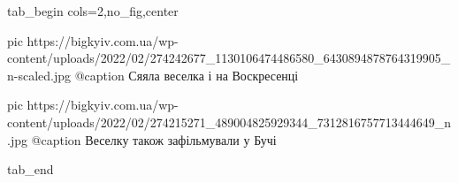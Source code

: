  
 
 
 
 


\ifcmt
  tab_begin cols=2,no_fig,center

     pic https://bigkyiv.com.ua/wp-content/uploads/2022/02/274242677_1130106474486580_6430894878764319905_n-scaled.jpg
		 @caption Сяяла веселка і на Воскресенці

		 pic https://bigkyiv.com.ua/wp-content/uploads/2022/02/274215271_489004825929344_7312816757713444649_n.jpg
		 @caption Веселку також зафільмували у Бучі

  tab_end
\fi
